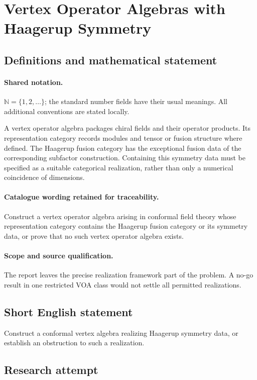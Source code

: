 \documentclass[11pt]{article}
\begin{document}
\section{Vertex Operator Algebras with Haagerup Symmetry}\label{statement}

\subsection{Definitions and mathematical statement}

\paragraph{Shared notation.}$\mathbb N=\{1,2,\ldots\}$; the standard number fields have their usual meanings. All additional conventions are stated locally.


A vertex operator algebra packages chiral fields and their operator products. Its representation category records modules and tensor or fusion structure where defined. The Haagerup fusion category has the exceptional fusion data of the corresponding subfactor construction. Containing this symmetry data must be specified as a suitable categorical realization, rather than only a numerical coincidence of dimensions.

\paragraph{Catalogue wording retained for traceability.}
Construct a vertex operator algebra arising in conformal field theory whose representation category contains the Haagerup fusion category or its symmetry data, or prove that no such vertex operator algebra exists.

\paragraph{Scope and source qualification.}The report leaves the precise realization framework part of the problem. A no-go result in one restricted VOA class would not settle all permitted realizations.
\subsection{Short English statement}
Construct a conformal vertex algebra realizing Haagerup symmetry data, or establish an obstruction to such a realization.
\subsection{Research attempt}
\end{document}
